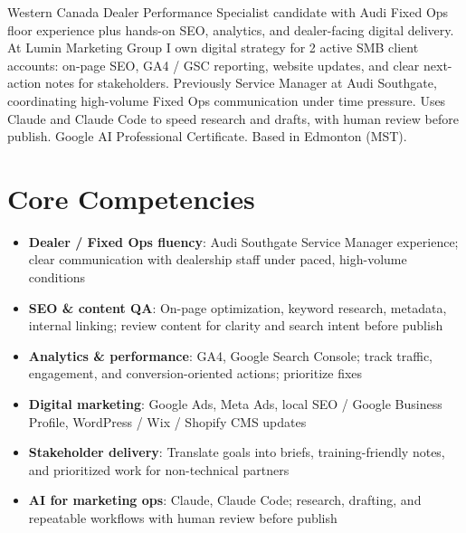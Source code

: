 \documentclass[11pt,a4paper,sans]{moderncv}
\begin{document}
\makecvtitle

\vspace{6pt}
\small{Western Canada Dealer Performance Specialist candidate with Audi Fixed Ops floor experience plus hands-on SEO, analytics, and dealer-facing digital delivery. At Lumin Marketing Group I own digital strategy for 2 active SMB client accounts: on-page SEO, GA4 / GSC reporting, website updates, and clear next-action notes for stakeholders. Previously Service Manager at Audi Southgate, coordinating high-volume Fixed Ops communication under time pressure. Uses Claude and Claude Code to speed research and drafts, with human review before publish. Google AI Professional Certificate. Based in Edmonton (MST).}

\section{Core Competencies}
\vspace{1pt}
\begin{itemize}
\item \textbf{Dealer / Fixed Ops fluency}: Audi Southgate Service Manager experience; clear communication with dealership staff under paced, high-volume conditions
\item \textbf{SEO \& content QA}: On-page optimization, keyword research, metadata, internal linking; review content for clarity and search intent before publish
\item \textbf{Analytics \& performance}: GA4, Google Search Console; track traffic, engagement, and conversion-oriented actions; prioritize fixes
\item \textbf{Digital marketing}: Google Ads, Meta Ads, local SEO / Google Business Profile, WordPress / Wix / Shopify CMS updates
\item \textbf{Stakeholder delivery}: Translate goals into briefs, training-friendly notes, and prioritized work for non-technical partners
\item \textbf{AI for marketing ops}: Claude, Claude Code; research, drafting, and repeatable workflows with human review before publish
\end{itemize}
\end{document}
